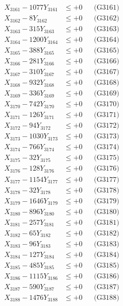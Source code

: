 \documentclass[a4paper,10pt]{article}
\begin{document}
{\begin{align}
\allowbreak
X_{3161} - 1077Y_{3161} &\leq +0 && \text{(G3161)} \\
X_{3162} - 8Y_{3162} &\leq +0 && \text{(G3162)} \\
X_{3163} - 315Y_{3163} &\leq +0 && \text{(G3163)} \\
X_{3164} - 1200Y_{3164} &\leq +0 && \text{(G3164)} \\
X_{3165} - 388Y_{3165} &\leq +0 && \text{(G3165)} \\
X_{3166} - 281Y_{3166} &\leq +0 && \text{(G3166)} \\
X_{3167} - 310Y_{3167} &\leq +0 && \text{(G3167)} \\
X_{3168} - 932Y_{3168} &\leq +0 && \text{(G3168)} \\
X_{3169} - 336Y_{3169} &\leq +0 && \text{(G3169)} \\
X_{3170} - 742Y_{3170} &\leq +0 && \text{(G3170)} \\
\allowbreak
X_{3171} - 126Y_{3171} &\leq +0 && \text{(G3171)} \\
X_{3172} - 94Y_{3172} &\leq +0 && \text{(G3172)} \\
X_{3173} - 1030Y_{3173} &\leq +0 && \text{(G3173)} \\
X_{3174} - 766Y_{3174} &\leq +0 && \text{(G3174)} \\
X_{3175} - 32Y_{3175} &\leq +0 && \text{(G3175)} \\
X_{3176} - 128Y_{3176} &\leq +0 && \text{(G3176)} \\
X_{3177} - 1154Y_{3177} &\leq +0 && \text{(G3177)} \\
X_{3178} - 32Y_{3178} &\leq +0 && \text{(G3178)} \\
X_{3179} - 1646Y_{3179} &\leq +0 && \text{(G3179)} \\
X_{3180} - 896Y_{3180} &\leq +0 && \text{(G3180)} \\
\allowbreak
X_{3181} - 257Y_{3181} &\leq +0 && \text{(G3181)} \\
X_{3182} - 65Y_{3182} &\leq +0 && \text{(G3182)} \\
X_{3183} - 96Y_{3183} &\leq +0 && \text{(G3183)} \\
X_{3184} - 127Y_{3184} &\leq +0 && \text{(G3184)} \\
X_{3185} - 485Y_{3185} &\leq +0 && \text{(G3185)} \\
X_{3186} - 1115Y_{3186} &\leq +0 && \text{(G3186)} \\
X_{3187} - 590Y_{3187} &\leq +0 && \text{(G3187)} \\
X_{3188} - 1476Y_{3188} &\leq +0 && \text{(G3188)} \\

\end{align}}
\end{document}
